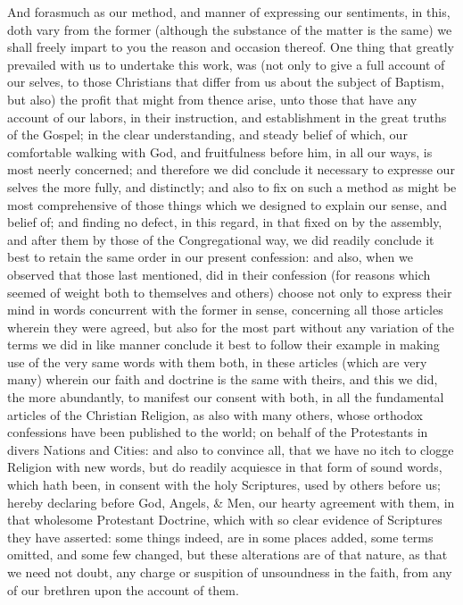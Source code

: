 \documentclass[12pt,a4paper]{book}
\begin{document}
And forasmuch as our method, and manner of expressing our sentiments, in this, doth vary from the former (although the substance of the matter is the same) we shall freely impart to you the reason and occasion thereof. One thing that greatly prevailed with us to undertake this work, was (not only to give a full account of our selves, to those Christians that differ from us about the subject of Baptism, but also) the profit that might from thence arise, unto those that have any account of our labors, in their instruction, and establishment in the great truths of the Gospel; in the clear understanding, and steady belief of which, our comfortable walking with God, and fruitfulness before him, in all our ways, is most neerly concerned; and therefore we did conclude it necessary to expresse our selves the more fully, and distinctly; and also to fix on such a method as might be most comprehensive of those things which we designed to explain our sense, and belief of; and finding no defect, in this regard, in that fixed on by the assembly, and after them by those of the Congregational way, we did readily conclude it best to retain the same order in our present confession: and also, when we observed that those last mentioned, did in their confession (for reasons which seemed of weight both to themselves and others) choose not only to express their mind in words concurrent with the former in sense, concerning all those articles wherein they were agreed, but also for the most part without any variation of the terms we did in like manner conclude it best to follow their example in making use of the very same words with them both, in these articles (which are very many) wherein our faith and doctrine is the same with theirs, and this we did, the more abundantly, to manifest our consent with both, in all the fundamental articles of the Christian Religion, as also with many others, whose orthodox confessions have been published to the world; on behalf of the Protestants in divers Nations and Cities: and also to convince all, that we have no itch to clogge Religion with new words, but do readily acquiesce in that form of sound words, which hath been, in consent with the holy Scriptures, used by others before us; hereby declaring before God, Angels, \& Men, our hearty agreement with them, in that wholesome Protestant Doctrine, which with so clear evidence of Scriptures they have asserted: some things indeed, are in some places added, some terms omitted, and some few changed, but these alterations are of that nature, as that we need not doubt, any charge or suspition of unsoundness in the faith, from any of our brethren upon the account of them.
\end{document}
